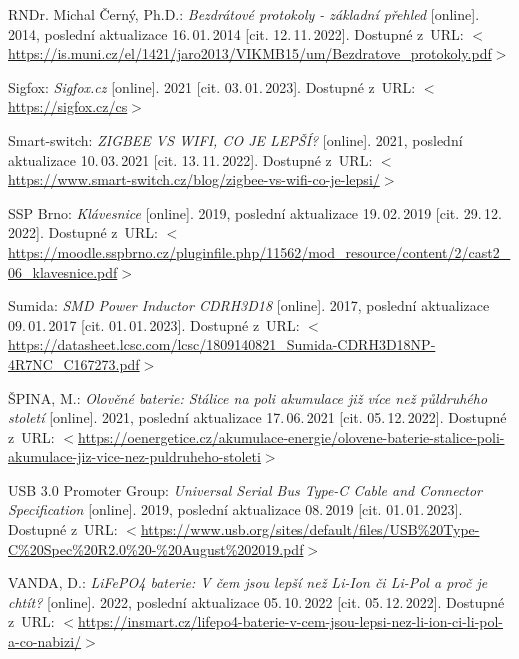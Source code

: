 \begin{thebibliography}{99}
    RNDr. Michal Černý, Ph.D.:
    \emph{Bezdrátové protokoly - základní přehled}\/ [online].
    2014, poslední aktualizace 16.\,01.\,2014 [cit. 12.\,11.\,2022].
    Dostupné z~URL: 
    \(<\)\url{https://is.muni.cz/el/1421/jaro2013/VIKMB15/um/Bezdratove_protokoly.pdf}\(>\)
    
    Sigfox:
    \emph{Sigfox.cz}\/ [online].
    2021 [cit. 03.\,01.\,2023].
    Dostupné z~URL: 
    \(<\)\url{https://sigfox.cz/cs}\(>\)

    Smart-switch:
    \emph{ZIGBEE VS WIFI, CO JE LEPŠÍ?}\/ [online].
    2021, poslední aktualizace 10.\,03.\,2021 [cit. 13.\,11.\,2022].
    Dostupné z~URL: 
    \(<\)\url{https://www.smart-switch.cz/blog/zigbee-vs-wifi-co-je-lepsi/}\(>\)

    SSP Brno:
    \emph{Klávesnice}\/ [online].
    2019, poslední aktualizace 19.\,02.\,2019 [cit. 29.\,12.\,2022]. %
    Dostupné z~URL:
    \(<\)\url{https://moodle.sspbrno.cz/pluginfile.php/11562/mod_resource/content/2/cast2_06_klavesnice.pdf}\(>\)

    Sumida:
    \emph{SMD Power Inductor CDRH3D18}\/ [online].
    2017, poslední aktualizace 09.\,01.\,2017 [cit. 01.\,01.\,2023]. 
    Dostupné z~URL:
    \(<\)\url{https://datasheet.lcsc.com/lcsc/1809140821_Sumida-CDRH3D18NP-4R7NC_C167273.pdf}\(>\)

    ŠPINA, M.:
    \emph{Olověné baterie: Stálice na poli akumulace již více než půldruhého století}\/ [online].
    2021, poslední aktualizace 17.\,06.\,2021 [cit. 05.\,12.\,2022].
    Dostupné z~URL:
    \(<\)\url{https://oenergetice.cz/akumulace-energie/olovene-baterie-stalice-poli-akumulace-jiz-vice-nez-puldruheho-stoleti}\(>\)

    USB 3.0 Promoter Group:
    \emph{Universal Serial Bus Type-C Cable and Connector Specification}\/ [online].
    2019, poslední aktualizace 08.\,2019 [cit. 01.\,01.\,2023]. 
    Dostupné z~URL:
    \(<\)\url{https://www.usb.org/sites/default/files/USB%20Type-C%20Spec%20R2.0%20-%20August%202019.pdf}\(>\)

    VANDA, D.:
    \emph{LiFePO4 baterie: V čem jsou lepší než Li-Ion či Li-Pol a proč je chtít?}\/ [online].
    2022, poslední aktualizace 05.\,10.\,2022 [cit. 05.\,12.\,2022].
    Dostupné z~URL:
    \(<\)\url{https://insmart.cz/lifepo4-baterie-v-cem-jsou-lepsi-nez-li-ion-ci-li-pol-a-co-nabizi/}\(>\)


\end{thebibliography}
